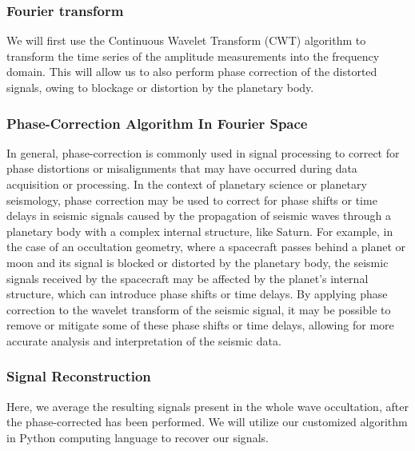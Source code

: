 \documentclass{article}
\begin{document}
\subsubsection{Fourier transform}
We will first use the Continuous Wavelet Transform (CWT) algorithm to transform the time series of the amplitude measurements into the frequency domain. This will allow us to also perform phase correction of the distorted signals, owing to blockage or distortion by the planetary body.
\subsubsection{Phase-Correction Algorithm In Fourier Space}
In general, phase-correction is commonly used in signal processing to correct for phase distortions or misalignments that may have occurred during data acquisition or processing. In the context of planetary science or planetary seismology, phase correction may be used to correct for phase shifts or time delays in seismic signals caused by the propagation of seismic waves through a planetary body with a complex internal structure, like Saturn. For example, in the case of an occultation geometry, where a spacecraft passes behind a planet or moon and its signal is blocked or distorted by the planetary body, the seismic signals received by the spacecraft may be affected by the planet's internal structure, which can introduce phase shifts or time delays. By applying phase correction to the wavelet transform of the seismic signal, it may be possible to remove or mitigate some of these phase shifts or time delays, allowing for more accurate analysis and interpretation of the seismic data.
\subsubsection{Signal Reconstruction}
Here, we average the resulting signals present in the whole wave occultation, after the phase-corrected has been performed. We will utilize our customized algorithm in Python computing language to recover our signals.
\end{document}
